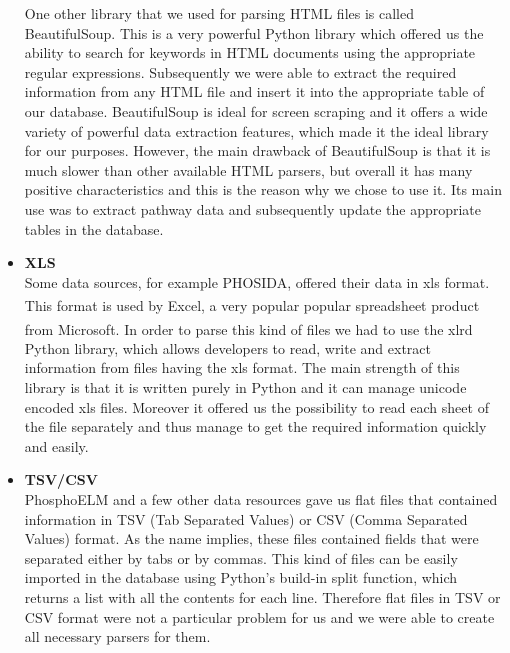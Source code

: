 \begin{itemize}
One other library that we used for parsing HTML files is called BeautifulSoup.
This is a very powerful Python library which offered us the ability to search for keywords in HTML documents using the appropriate regular expressions.
Subsequently we were able to extract the required information from any HTML file and insert it into the appropriate table of our database.
BeautifulSoup is ideal for screen scraping and it offers a wide variety of powerful data extraction features, which made it the ideal library for our purposes.
However, the main drawback of BeautifulSoup is that it is much slower than other available HTML parsers, but overall it has many positive characteristics and this is the reason why we chose to use it.
Its main use was to extract pathway data and subsequently update the appropriate tables in the database.

\item \textbf{XLS} \\
Some data sources, for example PHOSIDA, offered their data in xls format.
This format is used by Excel\textsuperscript{\texttrademark}, a very popular popular spreadsheet product from Microsoft\textsuperscript{\texttrademark}.
In order to parse this kind of files we had to use the xlrd Python library, which allows developers to read, write and extract information from files having the xls format.
The main strength of this library is that it is written purely in Python and it can manage unicode encoded xls files.
Moreover it offered us the possibility to read each sheet of the file separately and thus manage to get the required information quickly and easily.

\item \textbf{TSV/CSV} \\
PhosphoELM and a few other data resources gave us flat files that contained information in TSV (Tab Separated Values) or CSV (Comma Separated Values) format.
As the name implies, these files contained fields that were separated either by tabs or by commas.
This kind of files can be easily imported in the database using Python's build-in split function, which returns a list with all the contents for each line.
Therefore flat files in TSV or CSV format were not a particular problem for us and we were able to create all necessary parsers for them.

\end{itemize}

